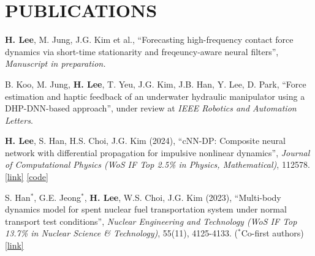 \documentclass[a4paper,10pt]{extarticle}
\begin{document}
\section*{PUBLICATIONS}
\begin{etaremune}[leftmargin=.5cm, itemsep=0.05cm]
	\item \textbf{H. Lee}, M. Jung, J.G. Kim et al., “Forecasting high-frequency contact force dynamics via short-time stationarity and freqeuncy-aware neural filters”, \textit{Manuscript in preparation.}

	\item B. Koo, M. Jung, \textbf{H. Lee}, T. Yeu, J.G. Kim, J.B. Han, Y. Lee, D. Park, “Force estimation and haptic feedback of an underwater hydraulic manipulator using a DHP-DNN-based approach”, under review at \textit{IEEE Robotics and Automation Letters}. %

	\item \textbf{H. Lee}, S. Han, H.S. Choi, J.G. Kim (2024), “cNN-DP: Composite neural network with differential propagation for impulsive nonlinear dynamics”, \textit{Journal of Computational Physics (WoS IF Top 2.5\% in Physics, Mathematical)}, 112578. \href{https://www.sciencedirect.com/science/article/pii/S0021999123006733}{[link]} \href{https://github.com/leehyeonbeen/cNN-DP}{[code]}

	\item S. Han$^*$, G.E. Jeong$^*$, \textbf{H. Lee}, W.S. Choi, J.G. Kim (2023), “Multi-body dynamics model for spent nuclear fuel transportation system under normal transport test conditions”, \textit{Nuclear Engineering and Technology (WoS IF Top 13.7\% in Nuclear Science \& Technology)}, 55(11), 4125-4133. {\small ($^*$Co-first authors)} \href{https://www.sciencedirect.com/science/article/pii/S1738573323003492}{[link]}
\end{etaremune}
\end{document}

